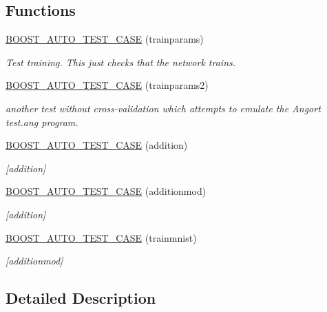 \subsection*{Functions}
\begin{DoxyCompactItemize}
\item 
\hyperlink{group__testtrainbasic_ga5c3fadab89e61757f56a2973008aa4a1}{B\+O\+O\+S\+T\+\_\+\+A\+U\+T\+O\+\_\+\+T\+E\+S\+T\+\_\+\+C\+A\+SE} (trainparams)
\begin{DoxyCompactList}\small\item\em Test training. This just checks that the network trains. \end{DoxyCompactList}\item 
\hyperlink{group__testtrainbasic_ga020c5c403ceb47796493d7363c2465a4}{B\+O\+O\+S\+T\+\_\+\+A\+U\+T\+O\+\_\+\+T\+E\+S\+T\+\_\+\+C\+A\+SE} (trainparams2)
\begin{DoxyCompactList}\small\item\em another test without cross-\/validation which attempts to emulate the Angort test.\+ang program. \end{DoxyCompactList}\item 
\hyperlink{group__testtrainbasic_gadb1cec4bf41ed539d9a93795d5c5f64c}{B\+O\+O\+S\+T\+\_\+\+A\+U\+T\+O\+\_\+\+T\+E\+S\+T\+\_\+\+C\+A\+SE} (addition)
\begin{DoxyCompactList}\small\item\em \mbox{[}addition\mbox{]} \end{DoxyCompactList}\item 
\hyperlink{group__testtrainbasic_ga229ecdc72ba159db56bf3f0a2935eac1}{B\+O\+O\+S\+T\+\_\+\+A\+U\+T\+O\+\_\+\+T\+E\+S\+T\+\_\+\+C\+A\+SE} (additionmod)
\begin{DoxyCompactList}\small\item\em \mbox{[}addition\mbox{]} \end{DoxyCompactList}\item 
\hyperlink{group__testtrainbasic_gabca8cd5d1eba965c33cfc84d0c7c21eb}{B\+O\+O\+S\+T\+\_\+\+A\+U\+T\+O\+\_\+\+T\+E\+S\+T\+\_\+\+C\+A\+SE} (trainmnist)
\begin{DoxyCompactList}\small\item\em \mbox{[}additionmod\mbox{]} \end{DoxyCompactList}\end{DoxyCompactItemize}


\subsection{Detailed Description}


